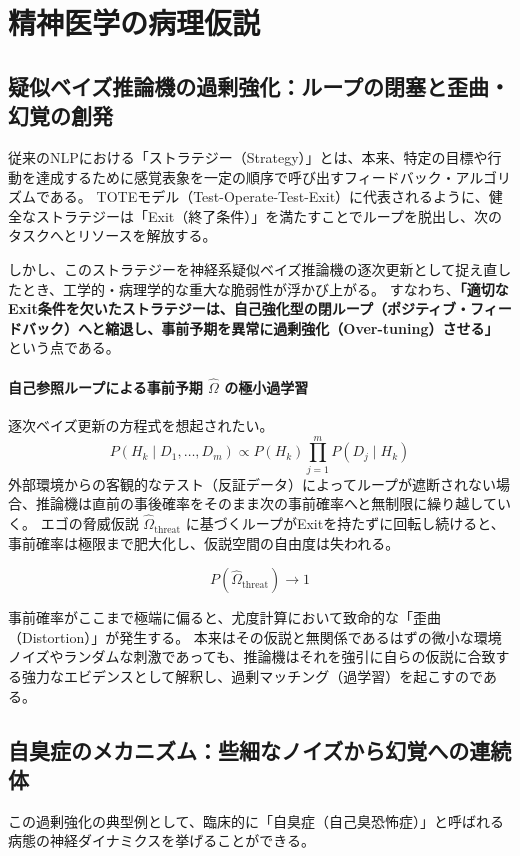\chapter{精神医学の病理仮説}
\section{疑似ベイズ推論機の過剰強化：ループの閉塞と歪曲・幻覚の創発}

従来のNLPにおける「ストラテジー（Strategy）」とは、本来、特定の目標や行動を達成するために感覚表象を一定の順序で呼び出すフィードバック・アルゴリズムである。
TOTEモデル（Test-Operate-Test-Exit）に代表されるように、健全なストラテジーは「Exit（終了条件）」を満たすことでループを脱出し、次のタスクへとリソースを解放する。

しかし、このストラテジーを神経系疑似ベイズ推論機の逐次更新として捉え直したとき、工学的・病理学的な重大な脆弱性が浮かび上がる。
すなわち、\textbf{「適切なExit条件を欠いたストラテジーは、自己強化型の閉ループ（ポジティブ・フィードバック）へと縮退し、事前予期を異常に過剰強化（Over-tuning）させる」}という点である。

\subsubsection{自己参照ループによる事前予期 $\hat{\Omega}$ の極小過学習}
逐次ベイズ更新の方程式を想起されたい。
\begin{equation}
    P(H_k \mid D_1, \dots, D_m) \propto P(H_k) \prod_{j=1}^m P(D_j \mid H_k)
\end{equation}
外部環境からの客観的なテスト（反証データ）によってループが遮断されない場合、推論機は直前の事後確率をそのまま次の事前確率へと無制限に繰り越していく。
エゴの脅威仮説 $\hat{\Omega}_{\mathrm{threat}}$ に基づくループがExitを持たずに回転し続けると、事前確率は極限まで肥大化し、仮説空間の自由度は失われる。

\begin{equation}
    P(\hat{\Omega}_{\mathrm{threat}}) \longrightarrow 1
\end{equation}

事前確率がここまで極端に偏ると、尤度計算において致命的な「歪曲（Distortion）」が発生する。
本来はその仮説と無関係であるはずの微小な環境ノイズやランダムな刺激であっても、推論機はそれを強引に自らの仮説に合致する強力なエビデンスとして解釈し、過剰マッチング（過学習）を起こすのである。


\section{自臭症のメカニズム：些細なノイズから幻覚への連続体}
この過剰強化の典型例として、臨床的に「自臭症（自己臭恐怖症）」と呼ばれる病態の神経ダイナミクスを挙げることができる。


